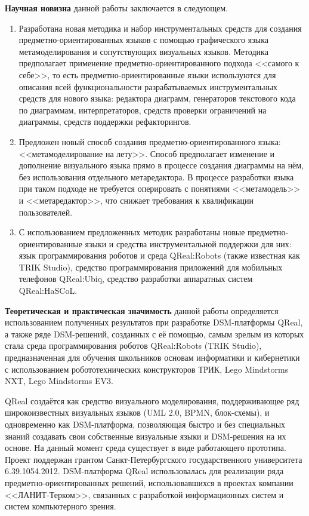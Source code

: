 \textbf{Научная новизна} данной работы заключается в следующем.
\begin{enumerate}
	\item Разработана новая методика и набор инструментальных средств для создания предметно-ориентированных 
		языков с помощью графического языка метамоделирования и сопутствующих визуальных языков.
		Методика предполагает применение предметно-ориентированного подхода <<самого к себе>>, то есть
		предметно-ориентированные языки используются для описания всей функциональности разрабатываемых
		инструментальных средств для нового языка: редактора диаграмм, генераторов текстового кода по 
		диаграммам, интерпретаторов, средств проверки ограничений на диаграммы, средств поддержки рефакторингов.
	\item Предложен новый способ создания предметно-ориентированного языка: <<метамоделирование на лету>>. 
		Способ предполагает изменение и дополнение визуального языка прямо в процессе создания диаграммы на нём,
		без использования отдельного метаредактора. В процессе разработки языка при таком подходе
		не требуется оперировать с понятиями <<метамодель>> и <<метаредактор>>, что снижает 
		требования к квалификации пользователей.
	\item С использованием предложенных методик разработаны новые предметно-ориентированные языки и
		средства инструментальной поддержки для них: язык программирования роботов и среда QReal:Robots
		(также известная как TRIK Studio), средство программирования приложений для мобильных телефонов 
		QReal:Ubiq, средство разработки аппаратных систем QReal:HaSCoL.
\end{enumerate}

\textbf{Теоретическая и практическая значимость} данной работы определяется использованием полученных 
результатов при разработке DSM-платформы QReal, а также ряде DSM-решений, созданных с её помощью, 
самым зрелым из которых стала среда программирования роботов QReal:Robots (TRIK Studio), 
предназначенная для обучения школьников основам информатики и кибернетики с использованием робототехнических 
конструкторов ТРИК, Lego Mindstorms NXT, Lego Mindstorms EV3.

QReal создаётся как средство визуального моделирования, поддерживающее ряд широкоизвестных 
визуальных языков (UML 2.0, BPMN, блок-схемы), и одновременно как DSM-платформа, 
позволяющая быстро и без специальных знаний создавать свои собственные 
визуальные языки и DSM-решения на их основе. На данный момент среда существует 
в виде работающего прототипа. Проект поддержан грантом Санкт-Петербургского 
государственного университета 6.39.1054.2012. DSM-платформа QReal использовалась
для реализации ряда предметно-ориентированных решений, использовавшихся в 
проектах компании <<ЛАНИТ-Терком>>, связанных с разработкой информационных систем 
и систем компьютерного зрения.

